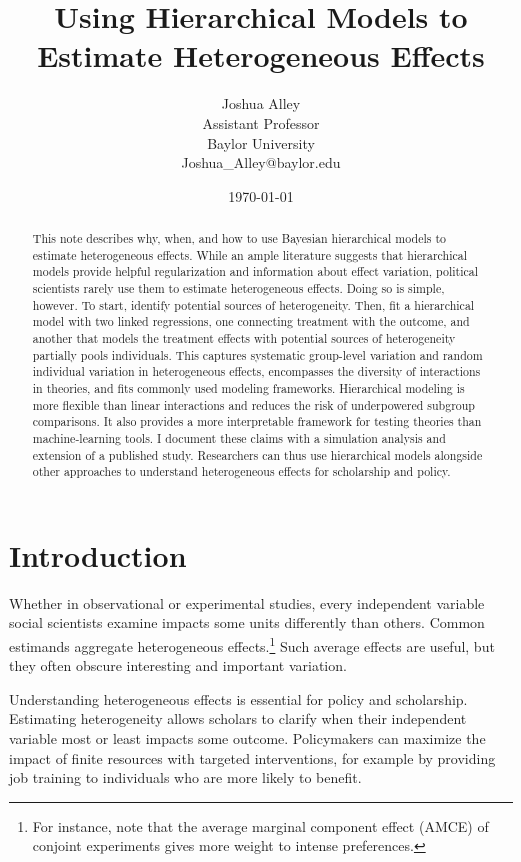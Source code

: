\documentclass[12pt]{article}
\title{\textbf{Using Hierarchical Models to Estimate Heterogeneous Effects}}
\author{Joshua Alley \\
Assistant Professor \\
Baylor University \\
Joshua\_Alley@baylor.edu
}
\date{\today}
\begin{document}
\maketitle 

\begin{abstract} 
This note describes why, when, and how to use Bayesian hierarchical models to estimate heterogeneous effects. 
While an ample literature suggests that hierarchical models provide helpful regularization and information about effect variation, political scientists rarely use them to estimate heterogeneous effects. 
Doing so is simple, however. 
To start, identify potential sources of heterogeneity. 
Then, fit a hierarchical model with two linked regressions, one connecting treatment with the outcome, and another that models the treatment effects with potential sources of heterogeneity partially pools individuals.
This captures systematic group-level variation and random individual variation in heterogeneous effects, encompasses the diversity of interactions in theories, and fits commonly used modeling frameworks. 
Hierarchical modeling is more flexible than linear interactions and reduces the risk of underpowered subgroup comparisons.
It also provides a more interpretable framework for testing theories than machine-learning tools. 
I document these claims with a simulation analysis and extension of a published study. 
Researchers can thus use hierarchical models alongside other approaches to understand heterogeneous effects for scholarship and policy.
\end{abstract} 


\newpage 
\doublespace 


\section{Introduction}


Whether in observational or experimental studies, every independent variable social scientists examine impacts some units differently than others. 
Common estimands aggregate heterogeneous effects.\footnote{For instance, \citet{Abramsonetal2022} note that the average marginal component effect (AMCE) of conjoint experiments gives more weight to intense preferences.} 
Such average effects are useful, but they often obscure interesting and important variation. 


Understanding heterogeneous effects is essential for policy and scholarship. 
Estimating heterogeneity allows scholars to clarify when their independent variable most or least impacts some outcome.
Policymakers can maximize the impact of finite resources with targeted interventions, for example by providing job training to individuals who are more likely to benefit. 
\end{document}
